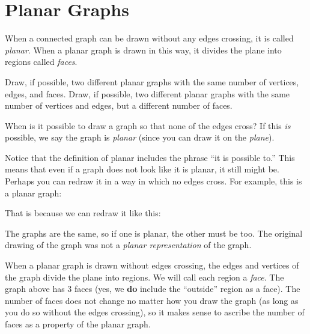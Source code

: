 \documentclass[12pt]{article}
\begin{document}
\newpage
\section{Planar Graphs}


\begin{activity}
When a connected graph can be drawn without any edges crossing, it is called {\em planar}.  When a planar graph is drawn in this way, it divides the plane into regions called {\em faces}.
\begin{questions}
\question Draw, if possible, two different planar graphs with the same number of vertices, edges, and faces.
\question Draw, if possible, two different planar graphs with the same number of vertices and edges, but a different number of faces.
\end{questions}
\end{activity}

When is it possible to draw a graph so that none of the edges cross? If this \emph{is} possible, we say the graph is \emph{planar} (since you can draw it on the \emph{plane}).  

Notice that the definition of planar includes the phrase ``it is possible to.''  This means that even if a graph does not look like it is planar, it still might be.  Perhaps you can redraw it in a way in which no edges cross.  For example, this is a planar graph:

\begin{center}

\end{center}

That is because we can redraw it like this:

\begin{center}
\end{center}

The graphs are the same, so if one is planar, the other must be too.  The original drawing of the graph was not a {\em planar representation} of the graph.

When a planar graph is drawn without edges crossing, the edges and vertices of the graph divide the plane into regions.  We will call each region a {\em face}.  The graph above has 3 faces (yes, we \textbf{do} include the ``outside'' region as a face).  The number of faces does not change no matter how you draw the graph (as long as you do so without the edges crossing), so it makes sense to ascribe the number of faces as a property of the planar graph.
\end{document}
